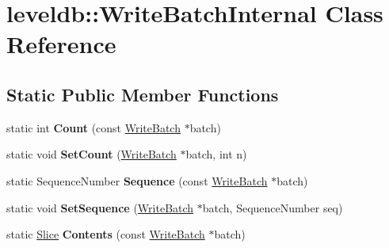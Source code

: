 \hypertarget{classleveldb_1_1_write_batch_internal}{}\section{leveldb\+::Write\+Batch\+Internal Class Reference}
\label{classleveldb_1_1_write_batch_internal}
\subsection*{Static Public Member Functions}
\begin{DoxyCompactItemize}
\item 
\mbox{\label{classleveldb_1_1_write_batch_internal_a5270ca4567dbae1524005ad14e0698e3}} 
static int {\bfseries Count} (const \mbox{\hyperlink{classleveldb_1_1_write_batch}{Write\+Batch}} $\ast$batch)
\item 
\mbox{\label{classleveldb_1_1_write_batch_internal_ae03d20619da53aae175dd28d61c90bd9}} 
static void {\bfseries Set\+Count} (\mbox{\hyperlink{classleveldb_1_1_write_batch}{Write\+Batch}} $\ast$batch, int n)
\item 
\mbox{\label{classleveldb_1_1_write_batch_internal_af657c82bd9378b78c35a3a7429f945d4}} 
static Sequence\+Number {\bfseries Sequence} (const \mbox{\hyperlink{classleveldb_1_1_write_batch}{Write\+Batch}} $\ast$batch)
\item 
\mbox{\label{classleveldb_1_1_write_batch_internal_a0ca3483de37433fb0ce37b1e91f01bd1}} 
static void {\bfseries Set\+Sequence} (\mbox{\hyperlink{classleveldb_1_1_write_batch}{Write\+Batch}} $\ast$batch, Sequence\+Number seq)
\item 
\mbox{\label{classleveldb_1_1_write_batch_internal_a348947b16653c8a17590b13115b5274d}} 
static \mbox{\hyperlink{classleveldb_1_1_slice}{Slice}} {\bfseries Contents} (const \mbox{\hyperlink{classleveldb_1_1_write_batch}{Write\+Batch}} $\ast$batch)
\item 
\mbox{\label{classleveldb_1_1_write_batch_internal_adad424f13cc3e3ed4a2eacb88eaa39df}} 

\end{DoxyCompactItemize}
